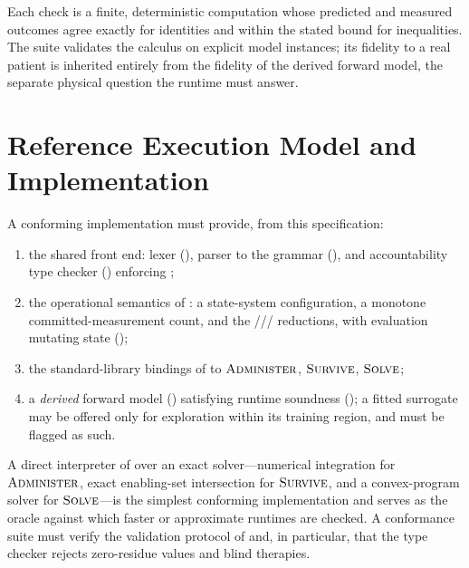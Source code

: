 Each check is a finite, deterministic computation whose predicted and measured
outcomes agree exactly for identities and within the stated bound for
inequalities. The suite validates the calculus on explicit model instances; its
fidelity to a real patient is inherited entirely from the fidelity of the
derived forward model, the separate physical question the runtime must answer.

\section{Reference Execution Model and Implementation}
\label{cfc:sec:impl}

A conforming  implementation must provide, from this specification:

\begin{enumerate}[leftmargin=1.6em,itemsep=2pt]
\item the shared front end: lexer (), parser to the grammar
(), and accountability type checker ()
enforcing ;
\item the operational semantics of : a state-system
configuration, a monotone committed-measurement count, and the
/// reductions, with evaluation
mutating state ();
\item the standard-library bindings of  to
$\textsc{Administer}$, $\textsc{Survive}$, $\textsc{Solve}$;
\item a \emph{derived} forward model () satisfying
runtime soundness (); a fitted surrogate may be offered only
for exploration within its training region, and must be flagged as such.
\end{enumerate}

\begin{remark}
\label{cfc:rem:reference-impl}
A direct interpreter of  over an exact solver---numerical
integration for $\textsc{Administer}$, exact enabling-set intersection for
$\textsc{Survive}$, and a convex-program solver for $\textsc{Solve}$---is the
simplest conforming implementation and serves as the oracle against which
faster or approximate runtimes are checked. A conformance suite must verify the
validation protocol of  and, in particular, that the type
checker rejects zero-residue values and blind therapies.
\end{remark}

